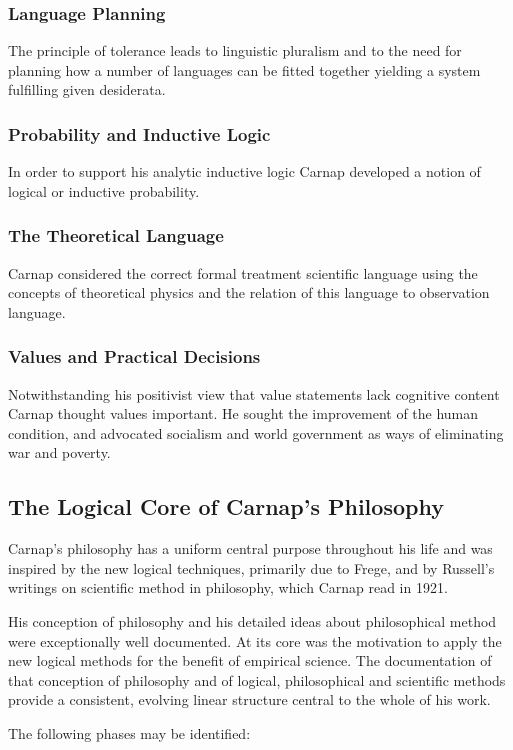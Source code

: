 \documentclass[10pt,titlepage]{book}
\begin{document}
\subsubsection{Language Planning}
The principle of tolerance leads to linguistic pluralism and to the need for planning how a number of languages can be fitted together yielding a system fulfilling given desiderata.
\subsubsection{Probability and Inductive Logic}
In order to support his analytic inductive logic Carnap developed a notion of logical or inductive probability.
\subsubsection{The Theoretical Language}
Carnap considered the correct formal treatment scientific language using the concepts of theoretical physics and the relation of this language to observation language.
\subsubsection{Values and Practical Decisions}
Notwithstanding his positivist view that value statements lack cognitive content Carnap thought values important. He sought the improvement of the human condition, and advocated socialism and world government as ways of eliminating war and poverty. 

\subsection{The Logical Core of Carnap's Philosophy}

Carnap's philosophy has a uniform central purpose throughout his life and was inspired by the new logical techniques, primarily due to Frege, and by Russell's writings on scientific method in philosophy, which Carnap read in 1921.

His conception of philosophy and his detailed ideas about philosophical method were exceptionally well documented.
At its core was the motivation to apply the new logical methods for the benefit of empirical science.
The documentation of that conception of philosophy and of logical, philosophical and scientific methods provide a consistent, evolving linear structure central to the whole of his work.

The following phases may be identified:
\end{document}
